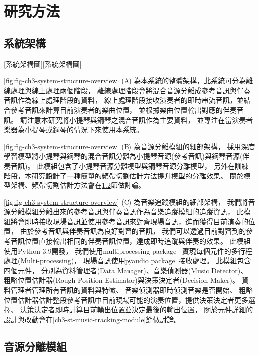 \documentclass[class=NCU_thesis, crop=false]{standalone}
\begin{document}
\chapter{研究方法}

\section{系統架構} \label{ch3-st-system-structure}
[系統架構圖][系統架構圖]

\cref{fig:fig-ch3-system-structure-overview} (A)
為本系統的整體架構，此系統可分為離線處理與線上處理兩個階段，
離線處理階段會將混合音源分離成參考音訊與伴奏音訊作為線上處理階段的資料，
線上處理階段接收演奏者的即時串流音訊，並結合參考音訊來計算目前演奏者的樂曲位置，
並根據樂曲位置輸出對應的伴奏音訊。
請注意本研究將小提琴與鋼琴之混合音訊作為主要資料，
並專注在當演奏者樂器為小提琴或鋼琴的情況下來使用本系統。

\cref{fig:fig-ch3-system-structure-overview} (B)
為音源分離模組的細部架構，
採用深度學習模型將小提琴與鋼琴的混合音訊分離為小提琴音源(參考音訊)與鋼琴音源(伴奏音訊)。
此模組包含了小提琴音源分離模型與鋼琴音源分離模型，
另外在訓練階段，本研究設計了一種簡單的頻帶切割估計方法提升模型的分離效果。
關於模型架構、頻帶切割估計方法會在\ref{ch3-st-mss-module}節做討論。

\cref{fig:fig-ch3-system-structure-overview} (C)
為音樂追蹤模組的細部架構，
我們將音源分離模組分離出來的參考音訊與伴奏音訊作為音樂追蹤模組的追蹤資訊，
此模組將會即時接收現場音訊並使用參考音訊來對齊現場音訊，進而獲得目前演奏的位置，
由於參考音訊與伴奏音訊為良好對齊的音訊，
我們可以透過目前對齊到的參考音訊位置直接輸出相同的伴奏音訊位置，達成即時追蹤與伴奏的效果。
此模組使用Python 3.9開發，
我們使用multiprocessing package~\cite{python2024multiprocessing}
實現每個元件的多行程處理(Multi-processing)，
現場音訊使用pyaudio package~\cite{python2024pyaudio}接收處理。
此模組包含四個元件，
分別為資料管理者(Data Manager)、音樂偵測器(Music Detector)、
粗略位置估計器(Rough Position Estimator)與決策決定者(Decision Maker)。
資料管理者管理所有音訊的資料與特徵、
音樂偵測器即時偵測音樂是否開始、
粗略位置估計器估計整段參考音訊中目前現場可能的演奏位置，提供決策決定者更多選擇、
決策決定者即時計算目前輸出位置並決定最後的輸出位置，
關於元件詳細的設計與改動會在\ref{ch3-st-music-tracking-module}節做討論。

\pagebreak

\section{音源分離模組} \label{ch3-st-mss-module}
\end{document}
